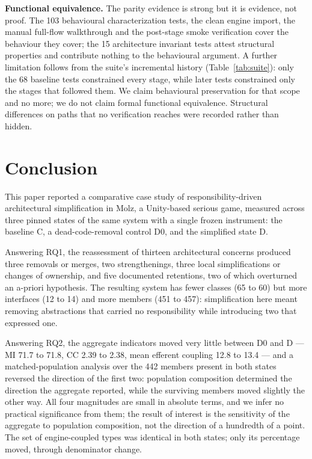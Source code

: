 \documentclass{sbc2019}%
\begin{document}
\medskip\noindent\textbf{Functional equivalence.} The parity evidence is strong
but it is evidence, not proof. The 103 behavioural characterization tests, the
clean engine import, the manual full-flow walkthrough and the post-stage smoke
verification cover the behaviour they cover; the 15 architecture invariant tests
attest structural properties and contribute nothing to the behavioural argument.
A further limitation follows from the suite's incremental history
(Table~\ref{tab:suite}): only the 68 baseline tests constrained every stage,
while later tests constrained only the stages that followed them. We claim behavioural preservation
for that scope and no more; we do not claim formal functional equivalence.
Structural differences on paths that no verification reaches were recorded rather
than hidden.


\FloatBarrier

\section{Conclusion}\label{sec:conclusion}

This paper reported a comparative case study of responsibility-driven
architectural simplification in Molz, a Unity-based serious game, measured across
three pinned states of the same system with a single frozen instrument: the
baseline C, a dead-code-removal control D0, and the simplified state D.

Answering RQ1, the reassessment of thirteen architectural concerns produced three
removals or merges, two strengthenings, three local simplifications or changes of
ownership, and five documented retentions, two of which overturned an a-priori
hypothesis. The resulting system has fewer classes
(65 to 60) but more interfaces (12 to 14) and more members (451 to 457):
simplification here meant removing abstractions that carried no responsibility
while introducing two that expressed one.

Answering RQ2, the aggregate indicators moved very little between D0 and D --- MI
71.7 to 71.8, CC 2.39 to 2.38, mean efferent coupling 12.8 to 13.4 --- and a
matched-population analysis over the 442 members present in both states reversed
the direction of the first two: population composition determined the direction
the aggregate reported, while the surviving members moved slightly the other way.
All four magnitudes are small in absolute terms, and we infer no practical
significance from them; the result of interest is the sensitivity of the
aggregate to population composition, not the direction of a hundredth of a
point. The set of engine-coupled types
was identical in both states; only its percentage moved, through denominator
change.
\end{document}
